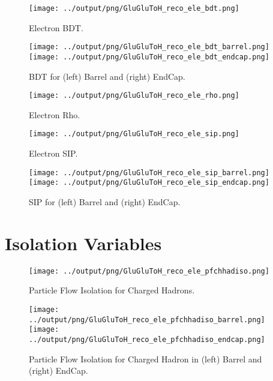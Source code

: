 \documentclass[11pt]{book}
\begin{document}
\begin{figure}[ht]
\centering
\texttt{[image: ../output/png/GluGluToH\_reco\_ele\_bdt.png]}
\caption{Electron BDT.}
\label{fig:gluglu_reco_ele_bdt}
\end{figure}

\begin{figure}[ht]
\centering
\texttt{[image: ../output/png/GluGluToH\_reco\_ele\_bdt\_barrel.png]}
\texttt{[image: ../output/png/GluGluToH\_reco\_ele\_bdt\_endcap.png]}
\caption{BDT for (left) Barrel and (right) EndCap.}
\label{fig:gluglu_reco_ele_bdt_regions}
\end{figure}

\begin{figure}[ht]
\centering
\texttt{[image: ../output/png/GluGluToH\_reco\_ele\_rho.png]}
\caption{Electron Rho.}
\label{fig:gluglu_reco_ele_rho}
\end{figure}

\begin{figure}[ht]
\centering
\texttt{[image: ../output/png/GluGluToH\_reco\_ele\_sip.png]}
\caption{Electron SIP.}
\label{fig:gluglu_reco_ele_sip}
\end{figure}

\begin{figure}[ht]
\centering
\texttt{[image: ../output/png/GluGluToH\_reco\_ele\_sip\_barrel.png]}
\texttt{[image: ../output/png/GluGluToH\_reco\_ele\_sip\_endcap.png]}
\caption{SIP for (left) Barrel and (right) EndCap.}
\label{fig:gluglu_reco_ele_sip_regions}
\end{figure}
\clearpage

\section{Isolation Variables}

\begin{figure}[ht]
\centering
\texttt{[image: ../output/png/GluGluToH\_reco\_ele\_pfchhadiso.png]}
\caption{Particle Flow Isolation for Charged Hadrons.}
\label{fig:gluglu_reco_ele_pfchhadiso}
\end{figure}

\begin{figure}[ht]
\centering
\texttt{[image: ../output/png/GluGluToH\_reco\_ele\_pfchhadiso\_barrel.png]}
\texttt{[image: ../output/png/GluGluToH\_reco\_ele\_pfchhadiso\_endcap.png]}
\caption{Particle Flow Isolation for Charged Hadron in (left) Barrel and (right) EndCap.}
\label{fig:gluglu_reco_ele_pfchhadiso_regions}
\end{figure}
\end{document}
